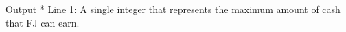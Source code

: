 Output
* Line 1: A single integer that represents the maximum amount of cash         that FJ can earn.